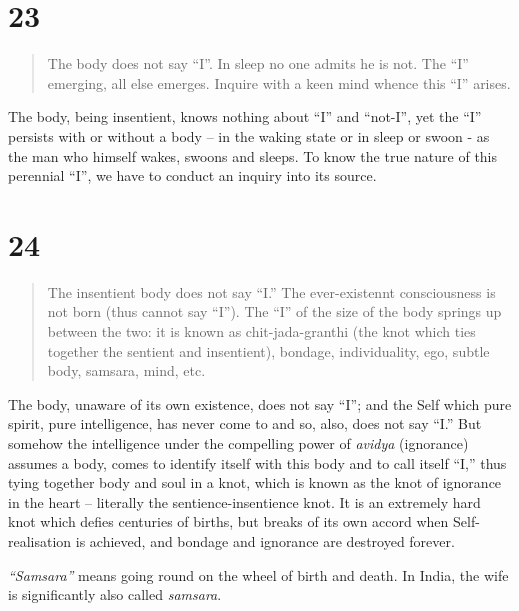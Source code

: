 \documentclass[12pt]{report}
\begin{document}
\section{23}

\begin{quote}
  The body does not say ``I''. In sleep no one admits he is not. The
  ``I'' emerging, all else emerges. Inquire with a keen mind whence this
  ``I'' arises.
\end{quote}

The body, being insentient, knows nothing about ``I'' and ``not-I'',
yet the ``I'' persists with or without a body -- in the waking state
or in sleep or swoon - as the man who himself wakes, swoons and
sleeps. To know the true nature of this perennial ``I'', we have to
conduct an inquiry into its source.


\section{24}

\begin{quote}
  The insentient body does not say ``I.'' The ever-existennt
  consciousness is not born (thus cannot say ``I''). The ``I'' of the
  size of the body springs up between the two: it is known as
  chit-jada-granthi (the knot which ties together the sentient and
  insentient), bondage, individuality, ego, subtle body, samsara, mind,
  etc. 
\end{quote}

The body, unaware of its own existence, does not say ``I''; and the
Self which pure spirit, pure intelligence, has never come to and so,
also, does not say ``I.'' But somehow the intelligence under the
compelling power of \emph{avidya} (ignorance) assumes a body, comes to
identify itself with this body and to call itself ``I,'' thus tying
together body and soul in a knot, which is known as the knot of
ignorance in the heart -- literally the sentience-insentience knot. It
is an extremely hard knot which defies centuries of births, but breaks
of its own accord when Self-realisation is achieved, and bondage and
ignorance are destroyed forever.

\emph{``Samsara''} means going round on the wheel of birth and
death. In India, the wife is significantly also called
\emph{samsara}. 

\end{document}
